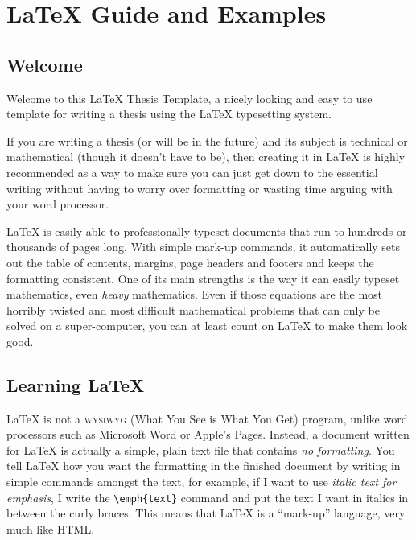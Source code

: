 \chapter{\LaTeX{} Guide and Examples}\label{chap:guide}

\newcommand{\keyword}[1]{\textbf{#1}}
\newcommand{\tabhead}[1]{\textbf{#1}}
\newcommand{\code}[1]{\texttt{#1}}
\newcommand{\file}[1]{\texttt{\bfseries#1}}
\newcommand{\option}[1]{\texttt{\itshape#1}}

\section{Welcome}
Welcome to this \LaTeX{} Thesis Template, a nicely looking and easy to use template for writing a thesis using the \LaTeX{} typesetting system.

If you are writing a thesis (or will be in the future) and its subject is technical or mathematical (though it doesn't have to be), then creating it in \LaTeX{} is highly recommended as a way to make sure you can just get down to the essential writing without having to worry over formatting or wasting time arguing with your word processor.

\LaTeX{} is easily able to professionally typeset documents that run to hundreds or thousands of pages long. With simple mark-up commands, it automatically sets out the table of contents, margins, page headers and footers and keeps the formatting consistent. One of its main strengths is the way it can easily typeset mathematics, even \emph{heavy} mathematics. Even if those equations are the most horribly twisted and most difficult mathematical problems that can only be solved on a super-computer, you can at least count on \LaTeX{} to make them look good.

\section{Learning \LaTeX{}}

\LaTeX{} is not a \textsc{wysiwyg} (What You See is What You Get) program, unlike word processors such as Microsoft Word or Apple's Pages. Instead, a document written for \LaTeX{} is actually a simple, plain text file that contains \emph{no formatting}. You tell \LaTeX{} how you want the formatting in the finished document by writing in simple commands amongst the text, for example, if I want to use \emph{italic text for emphasis}, I write the \verb|\emph{text}| command and put the text I want in italics in between the curly braces. This means that \LaTeX{} is a \enquote{mark-up} language, very much like HTML.

